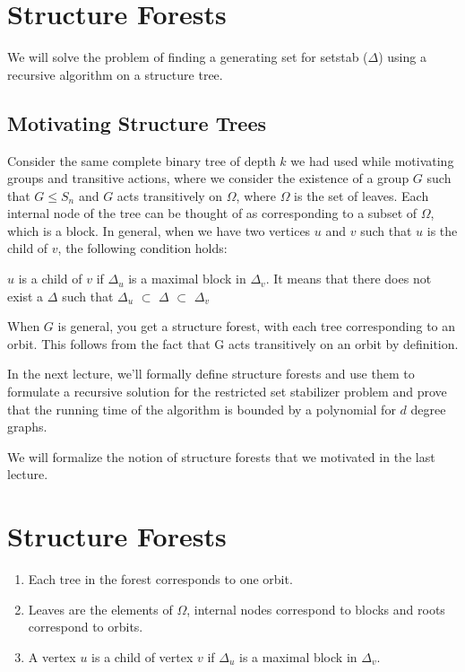 \section{Structure Forests}

We will solve the problem of finding a generating set for setstab ($\Delta$) using a recursive algorithm on a structure tree.

\subsection{Motivating Structure Trees}

Consider the same complete binary tree of depth $k$ we had used while motivating groups and transitive actions, where we consider the existence of a group $G$ such that $G \leqslant S_{n}$ and $G$ acts transitively on $\Omega$, where $\Omega$ is the set of leaves. Each internal node of the tree can be thought of as corresponding to a subset of $\Omega$, which is a block. In general, when we have two vertices $u$ and $v$ such that $u$ is the child of $v$, the following condition holds:
\begin{center}
$u$ is a child of $v$ if $\Delta_{u}$ is a maximal block in $\Delta_{v}$. It means that there does not exist a $\Delta$ such that $\Delta_{u}$ $\subset$ $\Delta$ $\subset$ $\Delta_{v}$ 
\end{center}

\begin{observation} 
When $G$ is general, you get a structure forest, with each tree corresponding to an orbit. This follows from the fact that G acts transitively on an orbit by definition. 
\end{observation}

In the next lecture, we'll formally define structure forests and use them to formulate a recursive solution for the restricted set stabilizer problem and prove that the running time of the algorithm is bounded by a polynomial for $d$ degree graphs.


We will formalize the notion of structure forests that we motivated in the last lecture.

\section{Structure Forests}
\begin{enumerate}
\item Each tree in the forest corresponds to one orbit.
\item Leaves are the elements of $\Omega$, internal nodes correspond to blocks and roots correspond to orbits.
\item A vertex $u$ is a child of vertex $v$ if $\Delta_{u}$ is a maximal block in $\Delta_{v}$.
\end{enumerate}

